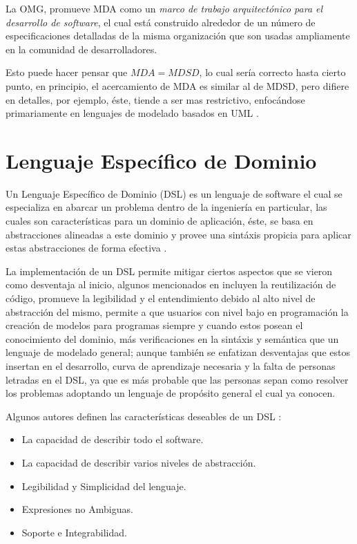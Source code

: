 La OMG, promueve MDA como un \textit{marco de trabajo arquitectónico para el
desarrollo de software}, el cual está construido alrededor de un número de
especificaciones detalladas de la misma organización que son usadas ampliamente
en la comunidad de desarrolladores.

Esto puede hacer pensar que $MDA=MDSD$, lo cual sería correcto hasta cierto
punto, en principio, el acercamiento de MDA es similar al de MDSD, pero difiere
en detalles, por ejemplo, éste, tiende a ser mas restrictivo, enfocándose
primariamente en lenguajes de modelado basados en UML \cite{mdsd}.


\section{Lenguaje Específico de Dominio}
\label{sec:dsl}
Un Lenguaje Específico de Dominio (DSL) es un lenguaje de software el cual se
especializa en abarcar un problema dentro de la ingeniería en particular, las
cuales son características para un dominio de aplicación, éste, se basa en
abstracciones alineadas a este dominio y provee una sintáxis propicia para
aplicar estas abstracciones de forma efectiva \cite{sobernig2015}.

La implementación de un DSL permite mitigar ciertos aspectos que se vieron como
desventaja al inicio, algunos mencionados en \cite{nguyen2014} incluyen la
reutilización de código, promueve la legibilidad y el entendimiento debido al alto
nivel de abstracción del mismo, permite a que usuarios con nivel bajo en
programación la creación de modelos para programas siempre y cuando estos
posean el conocimiento del dominio, más verificaciones en la sintáxis y
semántica que un lenguaje de modelado general; aunque también se enfatizan
desventajas que estos insertan en el desarrollo, curva de aprendizaje
necesaria y la falta de personas letradas en el DSL, ya que es más probable que
las personas sepan como resolver los problemas adoptando un lenguaje de
propósito general el cual ya conocen.

Algunos autores definen las características deseables de un DSL
\cite{mazanec2012}:
\begin{itemize}
	\item La capacidad de describir todo el software.
	\item La capacidad de describir varios niveles de abstracción.
	\item Legibilidad y Simplicidad del lenguaje.
	\item Expresiones no Ambiguas.
	\item Soporte e Integrabilidad.
\end{itemize}

